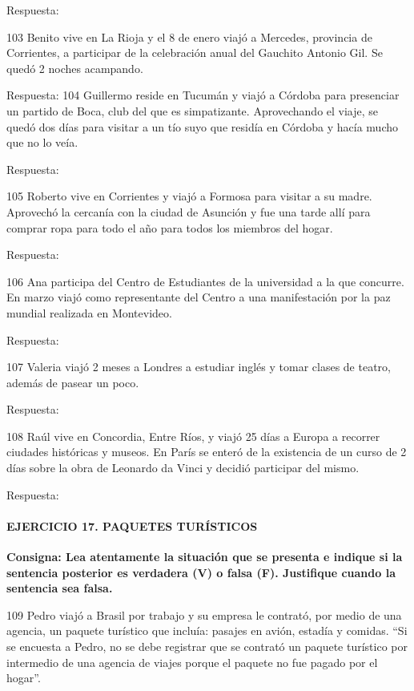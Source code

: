 \documentclass[
  openany]{book}
\begin{document}
Respuesta:

103 Benito vive en La Rioja y el 8 de enero viajó a Mercedes, provincia de Corrientes, a participar de la celebración anual del Gauchito Antonio Gil. Se quedó 2 noches acampando.

Respuesta: 104 Guillermo reside en Tucumán y viajó a Córdoba para presenciar un partido de Boca, club del que es simpatizante. Aprovechando el viaje, se quedó dos días para visitar a un tío suyo que residía en Córdoba y hacía mucho que no lo veía.

Respuesta:

105 Roberto vive en Corrientes y viajó a Formosa para visitar a su madre. Aprovechó la cercanía con la ciudad de Asunción y fue una tarde allí para comprar ropa para todo el año para todos los miembros del hogar.

Respuesta:

106 Ana participa del Centro de Estudiantes de la universidad a la que concurre. En marzo viajó como representante del Centro a una manifestación por la paz mundial realizada en Montevideo.

Respuesta:

107 Valeria viajó 2 meses a Londres a estudiar inglés y tomar clases de teatro, además de pasear un poco.

Respuesta:

108 Raúl vive en Concordia, Entre Ríos, y viajó 25 días a Europa a recorrer ciudades históricas y museos. En París se enteró de la existencia de un curso de 2 días sobre la obra de Leonardo da Vinci y decidió participar del mismo.

Respuesta:

\hypertarget{ejercicio-17.-paquetes-turuxedsticos}{%
\paragraph{\texorpdfstring{\textbf{EJERCICIO 17. PAQUETES TURÍSTICOS}}{EJERCICIO 17. PAQUETES TURÍSTICOS}}\label{ejercicio-17.-paquetes-turuxedsticos}}

\textbf{Consigna: Lea atentamente la situación que se presenta e indique si la sentencia posterior es verdadera (V) o falsa (F). Justifique cuando la sentencia sea falsa.}

109 Pedro viajó a Brasil por trabajo y su empresa le contrató, por medio de una agencia, un paquete turístico que incluía: pasajes en avión, estadía y comidas. ``Si se encuesta a Pedro, no se debe registrar que se contrató un paquete turístico por intermedio de una agencia de viajes porque el paquete no fue pagado por el hogar''.
\end{document}
